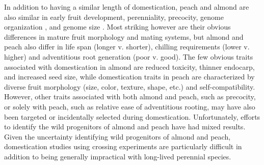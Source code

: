 \documentclass[12pt]{article}
\begin{document}
%
In addition to having a similar length of domestication, peach and almond are also similar in early fruit development, perenniality, precocity, genome organization \citep{arus2012peach}, and genome size \citep{arumuganathan1991nuclear, dickson1992nuclear, baird1994estimating,  loureiro2007two}.
%
Most striking however are their obvious differences in mature fruit morphology and mating systems, but almond and peach also differ in life span (longer v. shorter), chilling requirements (lower v. higher) and adventitious root generation (poor v. good).
%
The few obvious traits associated with domestication in almond are reduced toxicity, thinner endocarp, and increased seed size, while domestication traits in peach are characterized by diverse fruit morphology (size, color, texture, shape, etc.) and self-compatibility.
%
However, other traits associated with both almond and peach, such as precocity, or solely with peach, such as relative ease of adventitious rooting, may have also been targeted or incidentally selected during domestication. 
%
%
Unfortunately, efforts to identify the wild progenitors of almond and peach \citep{verde2013high, aradhya2004molecular, zeinalabedini2010origin, mowrey1990isozyme, browicz1996genus, ladizinsky1999origin, bassi20081} have had mixed results. 
%
Given the uncertainty identifying wild progenitors of almond and peach, domestication studies using crossing experiments are particularly difficult in addition to being generally impractical with long-lived perennial species.
%
%
\end{document}
